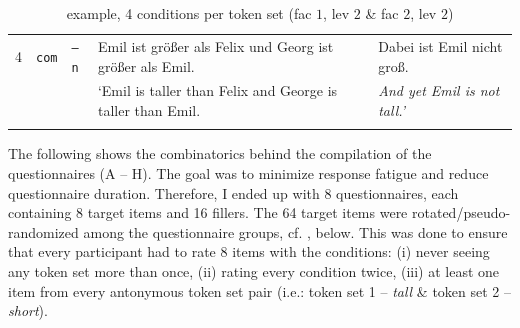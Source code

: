 \documentclass[output=paper,
modfonts
]{langscibook}
\begin{document}
\begin{table}
\begin{tabular}{lllll}
\midrule
4 & \texttt{com} & \texttt{\footnotesize{--}n} & Emil ist größer als Felix \hspace{0.65pt} und Georg ist \hspace{16pt} größer als Emil. & Dabei ist Emil nicht groß.   \\
 & & & {`Emil is taller than Felix \hspace{2pt} and George is \hspace{19pt} taller than Emil.} & \textit{And yet Emil is not tall.'}   \\
\lspbottomrule
\end{tabular}
\caption{example, 4 conditions  per token set (fac $1$, lev $2$ \& fac $2$, lev $2$)}
\label{tab:emil_example}
\end{table}


\noindent The following shows the combinatorics behind the compilation of the questionnaires (A -- H). The goal was to minimize response fatigue and reduce questionnaire duration. Therefore, I ended up with 8 questionnaires, each containing 8 target items and 16 fillers. The 64 target items were rotated/pseudo-randomized among the questionnaire groups, cf. , below. This was done to ensure that every participant had to rate 8 items with the conditions: (i) never seeing any token set more than once, (ii) rating every condition twice, (iii) at least one item from every antonymous token set pair (i.e.: token set 1 -- \textit{tall} \& token set 2 -- \textit{short}).
\end{document}
